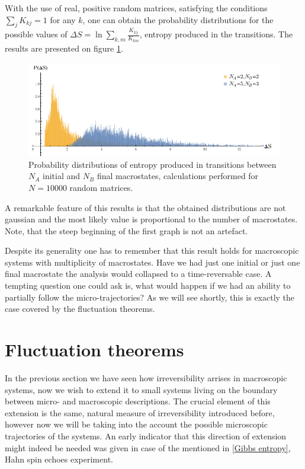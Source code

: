 \documentclass[a4paper,12pt]{article}
\begin{document}
With the use of real, positive random matrices, satisfying the conditions $\sum_j K_{kj} = 1$ for any $k$, one can obtain the probability distributions for the possible values of $\Delta S = \ln{\sum_{k,m} \frac{K_{kj}}{K_{km}}} $, entropy produced in the transitions. The results are presented on figure \ref{Fig5}.
\begin{figure}[ht!]
\centering \includegraphics[width=15cm]{Figure5} \caption{Probability distributions of entropy produced in transitions between $N_A$ initial and $N_B$ final macrostates, calculations performed for $N=10000$ random matrices.}
\label{Fig5} 
\end{figure}
A remarkable feature of this results is that the obtained distributions are not gaussian and the most likely value is proportional to the number of macrostates. Note, that the steep beginning of the first graph is not an artefact.


Despite its generality one has to remember that this result holds for macroscopic systems with multiplicity of macrostates. Have we had just one initial or just one final macrostate the analysis would collapsed to a time-reversable case. A tempting question one could ask is, what would happen if we had an ability to partially follow the micro-trajectories? As we will see shortly, this is exactly the case covered by the fluctuation theorems.

\section{Fluctuation theorems}
\label{FluctuationTheorems}
In the previous section we have seen how irreversibility arrises in macroscopic systems, now we wish to extend it to small systems living on the boundary between micro- and macroscopic descriptions. The crucial element of this extension is the same, natural measure of irreversibility introduced before, however now we will be taking into the account the possible microscopic trajectories of the systems. 
An early indicator that this direction of extension might indeed be needed was given in case of the mentioned in \ref{Gibbs entropy}, Hahn spin echoes experiment.
\end{document}
